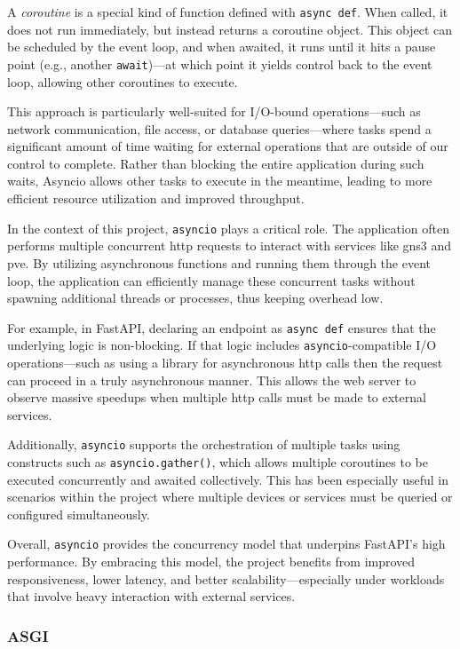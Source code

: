 A \textit{coroutine} is a special kind of function defined with \texttt{async def}. When called, it does not run immediately, 
but instead returns a coroutine object. This object can be scheduled by the event loop, and when awaited, it runs until it 
hits a pause point (e.g., another \texttt{await})—at which point it yields control back to the event loop, allowing other 
coroutines to execute.

This approach is particularly well-suited for I/O-bound operations—such as network communication, file access, or database 
queries—where tasks spend a significant amount of time waiting for external operations that are outside of our control to 
complete. Rather than blocking the entire application during such waits, Asyncio allows other tasks to execute in the 
meantime, leading to more efficient resource utilization and improved throughput.

In the context of this project, \texttt{asyncio} plays a critical role. The application often performs multiple concurrent 
\ac{http} requests to interact with services like \ac{gns3} and \ac{pve}. By utilizing asynchronous functions and running 
them through the event loop, the application can efficiently manage these concurrent tasks without spawning additional 
threads or processes, thus keeping overhead low.

For example, in FastAPI, declaring an endpoint as \texttt{async def} ensures that the underlying logic is non-blocking. 
If that logic includes \texttt{asyncio}-compatible I/O operations—such as using a library for asynchronous \ac{http} calls 
then the request can proceed in a truly asynchronous manner. This allows the web server to observe massive speedups when
multiple \ac{http} calls must be made to external services.

Additionally, \texttt{asyncio} supports the orchestration of multiple tasks using constructs such as \texttt{asyncio.gather()}, 
which allows multiple coroutines to be executed concurrently and awaited collectively. This has been especially useful in 
scenarios within the project where multiple devices or services must be queried or configured simultaneously.

Overall, \texttt{asyncio} provides the concurrency model that underpins FastAPI's high performance. By embracing this model, 
the project benefits from improved responsiveness, lower latency, and better scalability—especially under workloads that 
involve heavy interaction with external services.


\subsubsection{ASGI}


